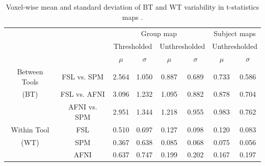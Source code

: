 \documentclass[11pt,onecolumn]{article}
\begin{document}
\setlength{\tabcolsep}{5pt}
\begin{table}[h]
  \centering
  \begin{tabular}{cccccc|cc}
    \toprule
                      &              & \multicolumn{4}{c|}{Group map}  & \multicolumn{2}{c}{Subject maps}                                                                     \\
    \multirow{2}{*}{} & {}           & \multicolumn{2}{c}{Thresholded} & \multicolumn{2}{c|}{Unthresholded} & \multicolumn{2}{c}{Unthresholded}                               \\
    {}                & {}           & $\mu$                           & $\sigma$                           & $\mu$                             & $\sigma$ & $\mu$ & $\sigma$ \\
    \midrule
    \rowcolor{lightgray!50}
    {Between Tools}   & FSL vs. SPM  & 2.564                           & 1.050                              & 0.887                             & 0.689    & 0.733 & 0.586    \\
    \rowcolor{lightgray!50}
    {(BT)}            & FSL vs. AFNI & 3.096                           & 1.232                              & 1.095                             & 0.882    & 0.878 & 0.704    \\
    \rowcolor{lightgray!50}
    {}                & AFNI vs. SPM & 2.951                           & 1.344                              & 1.218                             & 0.955    & 0.983 & 0.762    \\
    {Within Tool}     & FSL          & 0.510                           & 0.697                              & 0.127                             & 0.098    & 0.120 & 0.083    \\
    {(WT)}            & SPM          & 0.367                           & 0.638                              & 0.085                             & 0.068    & 0.075 & 0.056    \\
    {}                & AFNI         & 0.637                           & 0.747                              & 0.199                             & 0.202    & 0.167 & 0.197    \\
    \bottomrule
  \end{tabular}
  \caption{Voxel-wise mean and standard deviation of BT and WT variability
    in t-statistics maps .}
  \label{table:pipeline-stats}
\end{table}
\end{document}
